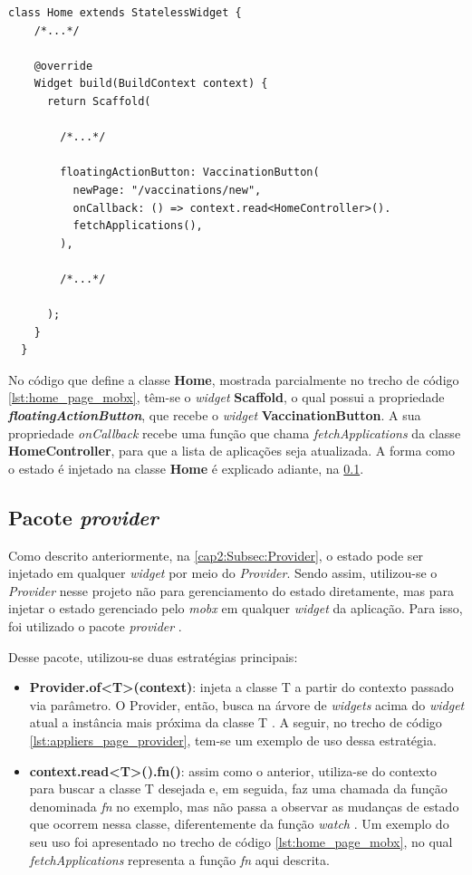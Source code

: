 \begin{lstlisting}[caption={Uso do \textit{MobX} no \textit{widget} \textbf{Home}}, label={lst:home_page_mobx}]
  class Home extends StatelessWidget {
    /*...*/

    @override
    Widget build(BuildContext context) {
      return Scaffold(
        
        /*...*/
      
        floatingActionButton: VaccinationButton(
          newPage: "/vaccinations/new",
          onCallback: () => context.read<HomeController>().
          fetchApplications(),
        ),
        
        /*...*/

      );
    }
  }
\end{lstlisting}

No código que define a classe \textbf{Home}, mostrada parcialmente no trecho de código \ref{lst:home_page_mobx}, têm-se o \textit{widget} \textbf{Scaffold}, o qual possui a propriedade \textbf{\textit{floatingActionButton}}, que recebe o \textit{widget} \textbf{VaccinationButton}. A sua propriedade \textit{onCallback} recebe uma função que chama \textit{fetchApplications} da classe \textbf{HomeController}, para que a lista de aplicações seja atualizada. A forma como o estado é injetado na classe \textbf{Home} é explicado adiante, na \ref{cap4:Subsec:Provider}.

\subsection{Pacote \textit{provider}}
\label{cap4:Subsec:Provider}
Como descrito anteriormente, na \ref{cap2:Subsec:Provider}, o estado pode ser injetado em qualquer \textit{widget} por meio do \textit{Provider}. Sendo assim, utilizou-se o \textit{Provider} nesse projeto não para gerenciamento do estado diretamente, mas para injetar o estado gerenciado pelo \textit{mobx} em qualquer \textit{widget} da aplicação. Para isso, foi utilizado o pacote \textit{provider} \cite{provider-package}.

Desse pacote, utilizou-se duas estratégias principais:
\begin{itemize}
  \item \textbf{Provider.of<T>(context)}: injeta a classe T a partir do contexto passado via parâmetro. O Provider, então, busca na árvore de \textit{widgets} acima do \textit{widget} atual a instância mais próxima da classe T \cite{provider-package}. A seguir, no trecho de código \ref{lst:appliers_page_provider}, tem-se um exemplo de uso dessa estratégia.
  \item \textbf{context.read<T>().fn()}: assim como o anterior, utiliza-se do contexto para buscar a classe T desejada e, em seguida, faz uma chamada da função denominada \textit{fn} no exemplo, mas não passa a observar as mudanças de estado que ocorrem nessa classe, diferentemente da função \textit{watch} \cite{provider-package}. Um exemplo do seu uso foi apresentado no trecho de código \ref{lst:home_page_mobx}, no qual \textit{fetchApplications} representa a função \textit{fn} aqui descrita.
\end{itemize}

